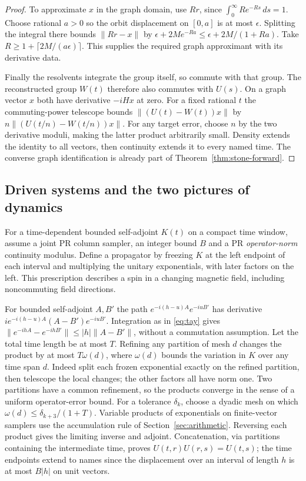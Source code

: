 \begin{proof}
To approximate $x$ in the graph domain, use $Rr$, since $\int_0^\infty Re^{-Rs}\,ds=1$. Choose rational $a>0$ so the orbit displacement on $[0,a]$ is at most $\epsilon$. Splitting the integral there bounds $\|Rr-x\|$ by $\epsilon+2M e^{-Ra}\le\epsilon+2M/(1+Ra)$. Take $R\ge1+\lceil2M/(a\epsilon)\rceil$. This supplies the required graph approximant with its derivative data.

Finally the resolvents integrate the group itself, so commute with that group. The reconstructed group $W(t)$ therefore also commutes with $U(s)$. On a graph vector $x$ both have derivative $-iHx$ at zero. For a fixed rational $t$ the commuting-power telescope bounds $\|(U(t)-W(t))x\|$ by $n\|(U(t/n)-W(t/n))x\|$. For any target error, choose $n$ by the two derivative moduli, making the latter product arbitrarily small. Density extends the identity to all vectors, then continuity extends it to every named time. The converse graph identification is already part of Theorem~\ref{thm:stone-forward}.
\end{proof}

\subsection{Driven systems and the two pictures of dynamics}
For a time-dependent bounded self-adjoint $K(t)$ on a compact time window, assume a joint PR column sampler, an integer bound $B$ and a PR \emph{operator-norm} continuity modulus. Define a propagator by freezing $K$ at the left endpoint of each interval and multiplying the unitary exponentials, with later factors on the left. This prescription describes a spin in a changing magnetic field, including noncommuting field directions.

For bounded self-adjoint $A,B'$ the path $e^{-i(h-u)A}e^{-iuB'}$ has derivative $ie^{-i(h-u)A}(A-B')e^{-iuB'}$. Integration as in \eqref{eq:tay} gives $\|e^{-ihA}-e^{-ihB'}\|\le |h|\|A-B'\|$, without a commutation assumption. Let the total time length be at most $T$. Refining any partition of mesh $d$ changes the product by at most $T\omega(d)$, where $\omega(d)$ bounds the variation in $K$ over any time span $d$. Indeed split each frozen exponential exactly on the refined partition, then telescope the local changes; the other factors all have norm one. Two partitions have a common refinement, so the products converge in the sense of a uniform operator-error bound. For a tolerance $\delta_k$, choose a dyadic mesh on which $\omega(d)\le\delta_{k+3}/(1+T)$. Variable products of exponentials on finite-vector samplers use the accumulation rule of Section~\ref{sec:arithmetic}. Reversing each product gives the limiting inverse and adjoint. Concatenation, via partitions containing the intermediate time, proves $U(t,r)U(r,s)=U(t,s)$; the time endpoints extend to names since the displacement over an interval of length $h$ is at most $B|h|$ on unit vectors.

